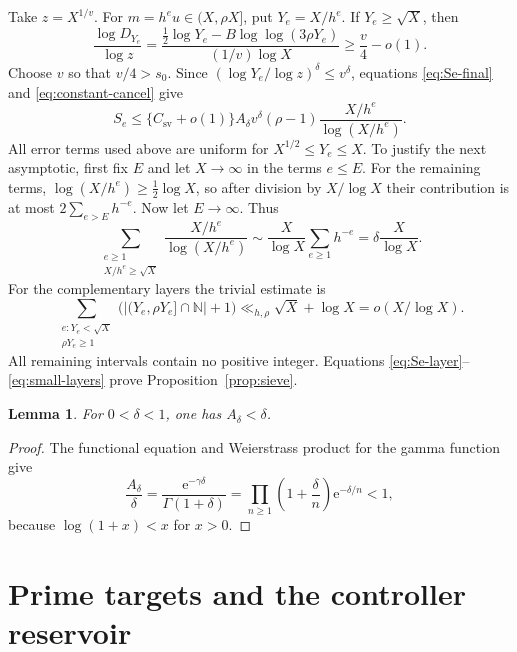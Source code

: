 \documentclass[10pt]{amsart}
\numberwithin{equation}{section}
\newcommand{\N}{\mathbb N}
\newcommand{\e}{\mathrm e}
\newtheorem{lemma}[theorem]{Lemma}
\theoremstyle{remark}
\begin{document}
Take \(z=X^{1/v}\). For \(m=h^eu\in(X,\rho X]\), put \(Y_e=X/h^e\).
If \(Y_e\ge\sqrt X\), then
\begin{equation}\label{eq:sieve-level-ratio}
 \frac{\log D_{Y_e}}{\log z}
 =
 \frac{\tfrac12\log Y_e-B\log\log(3\rho Y_e)}
 {(1/v)\log X}
 \ge\frac v4-o(1).
\end{equation}
Choose \(v\) so that \(v/4>s_0\). Since
\((\log Y_e/\log z)^\delta\le v^\delta\), equations
\eqref{eq:Se-final} and \eqref{eq:constant-cancel} give
\begin{equation}\label{eq:Se-layer}
 S_e\le\{C_{\mathrm{sv}}+o(1)\}
 A_\delta v^\delta(\rho-1)
 \frac{X/h^e}{\log(X/h^e)}.
\end{equation}
All error terms used above are uniform for \(X^{1/2}\le Y_e\le X\).
To justify the next asymptotic, first fix \(E\) and let \(X\to\infty\) in
the terms \(e\le E\). For the remaining terms,
\(\log(X/h^e)\ge\frac12\log X\), so after division by \(X/\log X\)
their contribution is at most \(2\sum_{e>E}h^{-e}\). Now let
\(E\to\infty\). Thus
\begin{equation}\label{eq:layer-sum}
 \sum_{\substack{e\ge1\\X/h^e\ge\sqrt X}}
 \frac{X/h^e}{\log(X/h^e)}
 \sim
 \frac X{\log X}\sum_{e\ge1}h^{-e}
 =
 \delta\frac X{\log X}.
\end{equation}
For the complementary layers the trivial estimate is
\begin{equation}\label{eq:small-layers}
 \sum_{\substack{e:Y_e<\sqrt X\\\rho Y_e\ge1}}
 \bigl(|(Y_e,\rho Y_e]\cap\N|+1\bigr)
 \ll_{h,\rho}\sqrt X+\log X
 =o(X/\log X).
\end{equation}
All remaining intervals contain no positive integer. Equations
\eqref{eq:Se-layer}--\eqref{eq:small-layers} prove
Proposition~\ref{prop:sieve}.

\begin{lemma}\label{lem:Adelta}
For \(0<\delta<1\), one has \(A_\delta<\delta\).
\end{lemma}

\begin{proof}
The functional equation and Weierstrass product for the gamma function give
\[
 \frac{A_\delta}{\delta}
 =
 \frac{\e^{-\gamma\delta}}{\Gamma(1+\delta)}
 =
 \prod_{n\ge1}\left(1+\frac\delta n\right)\e^{-\delta/n}
 <1,
\]
because \(\log(1+x)<x\) for \(x>0\).
\end{proof}

\section{Prime targets and the controller reservoir}
\end{document}

